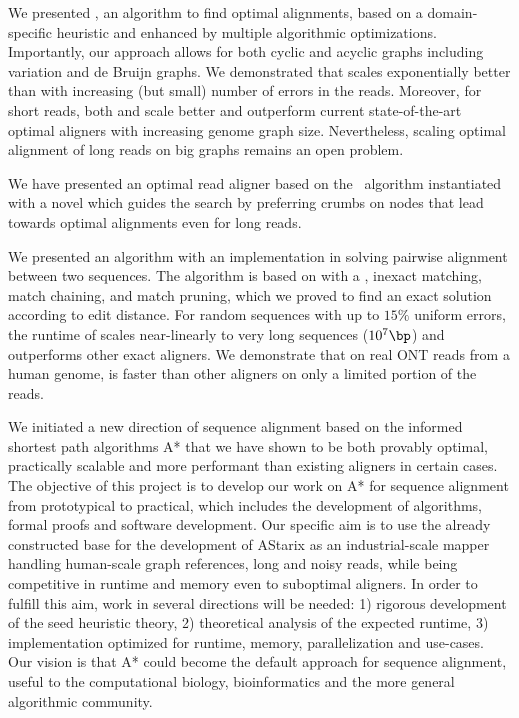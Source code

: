 
We presented \astarix, an \A algorithm to find optimal alignments, based on a
domain-specific heuristic and enhanced by multiple algorithmic optimizations.
Importantly, our approach allows for both cyclic and acyclic graphs including
variation and de Bruijn graphs. We demonstrated that \astarix scales exponentially better than \dijkstra with
increasing (but small) number of errors in the reads. Moreover, for short reads,
both \astarix and \dijkstra scale better and outperform current state-of-the-art
optimal aligners with increasing genome graph size. Nevertheless, scaling
optimal alignment of long reads on big graphs remains an open problem.

We have presented an optimal read aligner based on the \A~algorithm instantiated
with a novel \seedh which guides the search by preferring crumbs on nodes that lead
towards optimal alignments even for long reads.

We presented an algorithm with an implementation in \astarpa solving pairwise alignment between
two sequences. The algorithm is based on \A with a \sh, inexact matching, match
chaining, and match pruning, which we proved to find an exact solution according
to edit distance. For random sequences with up to $15\%$ uniform errors, the
runtime of \astarpa scales near-linearly to very long sequences ($10^7\bp$)
and outperforms other exact aligners. We demonstrate that on real ONT reads from
a human genome, \astarpa is faster than other aligners on only a limited portion of the
reads.

We initiated a new direction of sequence alignment based on the informed
shortest path algorithms A* that we have shown to be both provably optimal,
practically scalable and more performant than existing aligners in certain
cases. The objective of this project is to develop our work on A* for sequence
alignment from prototypical to practical, which includes the development of
algorithms, formal proofs and software development. Our specific aim is to use
the already constructed base for the development of AStarix as an
industrial-scale mapper handling human-scale graph references, long and noisy
reads, while being competitive in runtime and memory even to suboptimal
aligners. In order to fulfill this aim, work in several directions will be
needed: 1) rigorous development of the seed heuristic theory, 2) theoretical
analysis of the expected runtime, 3) implementation optimized for runtime,
memory, parallelization and use-cases. Our vision is that A* could become the
default approach for sequence alignment, useful to the computational biology,
bioinformatics and the more general algorithmic community.

